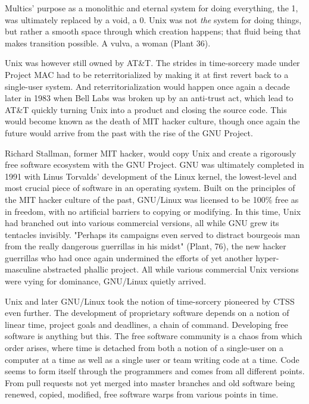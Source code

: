 \documentclass[12pt, a5paper, twoside, openright]{memoir}
\begin{document}
Multics' purpose as a monolithic and eternal system for doing everything, the 1, was ultimately replaced by a void, a 0. Unix was not \emph{the} system for doing things, but rather a smooth space through which creation happens; that fluid being that makes transition possible. A vulva, a woman (Plant 36).

Unix was however still owned by AT\&T. The strides in time-sorcery made under Project MAC had to be reterritorialized by making it at first revert back to a single-user system. And reterritorialization would happen once again a decade later in 1983 when Bell Labs was broken up by an anti-trust act, which lead to AT\&T quickly turning Unix into a product and closing the source code. This would become known as the death of MIT hacker culture, though once again the future would arrive from the past with the rise of the GNU Project.

Richard Stallman, former MIT hacker, would copy Unix and create a rigorously free software ecosystem with the GNU Project. GNU was ultimately completed in 1991 with Linus Torvalds' development of the Linux kernel, the lowest-level and most crucial piece of software in an operating system. Built on the principles of the MIT hacker culture of the past, GNU/Linux was licensed to be 100\% free as in freedom, with no artificial barriers to copying or modifying. In this time, Unix had branched out into various commercial versions, all while GNU grew its tentacles invisibly. "Perhaps its campaigns even served to distract bourgeois man from the really dangerous guerrillas in his midst" (Plant, 76), the new hacker guerrillas who had once again undermined the efforts of yet another hyper-masculine abstracted phallic project. All while various commercial Unix versions were vying for dominance, GNU/Linux quietly arrived.

Unix and later GNU/Linux took the notion of time-sorcery pioneered by CTSS even further. The development of proprietary software depends on a notion of linear time, project goals and deadlines, a chain of command. Developing free software is anything but this. The free software community is a chaos from which order arises, where time is detached from both a notion of a single-user on a computer at a time as well as a single user or team writing code at a time. Code seems to form itself through the programmers and comes from all different points. From pull requests not yet merged into master branches and old software being renewed, copied, modified, free software warps from various points in time.
\end{document}

